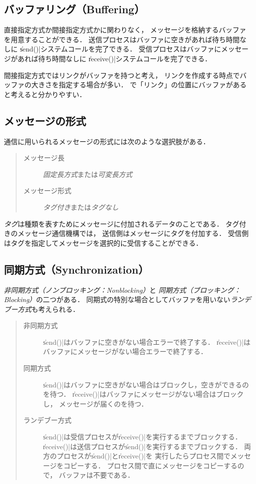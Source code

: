 \subsection{バッファリング（Buffering）}
直接指定方式か間接指定方式かに関わりなく，
メッセージを格納するバッファを用意することができる．
送信プロセスはバッファに空きがあれば待ち時間なしに
\|send()|システムコールを完了できる．
受信プロセスはバッファにメッセージがあれば待ち時間なしに
\|receive()|システムコールを完了できる．

間接指定方式ではリンクがバッファを持つと考え，
リンクを作成する時点でバッファの大きさを指定する場合が多い．
で「リンク」の位置にバッファがあると考えると分かりやすい．

\subsection{メッセージの形式}
通信に用いられるメッセージの形式には次のような選択肢がある．

\begin{quote}
  \begin{description}
  \item [メッセージ長] \emph{固定長方式}または\emph{可変長方式}
  \item [メッセージ形式] \emph{タグ付き}または\emph{タグなし}
  \end{description}
\end{quote}

\emph{タグ}は種類を表すためにメッセージに付加されるデータのことである．
タグ付きのメッセージ通信機構では，
送信側はメッセージにタグを付加する．
受信側はタグを指定してメッセージを選択的に受信することができる．

\subsection{同期方式（Synchronization）}
\emph{非同期方式（ノンブロッキング：Nonblocking）}と
\emph{同期方式（ブロッキング：Blocking）}の二つがある．
同期式の特別な場合としてバッファを用いない\emph{ランデブー方式}も考えられる．

\begin{quote}
  \begin{description}
  \item [非同期方式]
    \|send()|はバッファに空きがない場合エラーで終了する．
    \|receive()|はバッファにメッセージがない場合エラーで終了する．
  \item [同期方式]
    \|send()|はバッファに空きがない場合はブロックし，空きができるのを待つ．
    \|receive()|はバッファにメッセージがない場合はブロックし，
    メッセージが届くのを待つ．
  \item [ランデブー方式]
    \|send()|は受信プロセスが\|receive()|を実行するまでブロックする．
    \|receive()|は送信プロセスが\|send()|を実行するまでブロックする．
    両方のプロセスが\|send()|と\|receive()|を
    実行したらプロセス間でメッセージをコピーする．
    プロセス間で直にメッセージをコピーするので，
    バッファは不要である．
  \end{description}
\end{quote}

